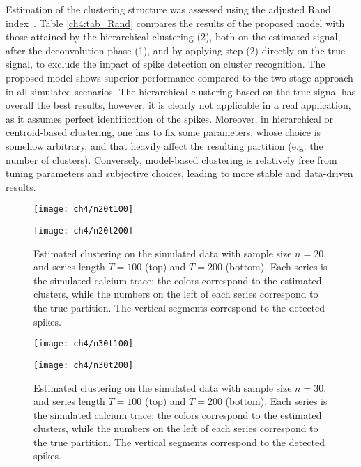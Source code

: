 Estimation of the clustering structure was assessed using the adjusted Rand index~\parencite{rand1971,hubert1985}. Table \ref{ch4:tab_Rand} compares the results of the proposed model with those attained by the hierarchical clustering (2), both on the estimated signal, after the deconvolution phase (1), and by applying step (2) directly on the true signal, to exclude the impact of spike detection on cluster recognition. The proposed model shows superior performance compared to the two-stage approach in all simulated scenarios. The hierarchical clustering based on the true signal has overall the best results, however, it is clearly not applicable in a real application, as it assumes perfect identification of the spikes.
Moreover, in hierarchical or centroid-based clustering, one has to fix some parameters, whose choice is somehow arbitrary, and that heavily affect the resulting partition (e.g. the number of clusters). Conversely, model-based clustering is relatively free from tuning parameters and subjective choices, leading to more stable and data-driven results.

\begin{figure}[b]
	\centering
	\texttt{[image: ch4/n20t100]}\\
	\centerline{
		\texttt{[image: ch4/n20t200]}
	}
	\label{ch4:fig_n20}
	\caption[Estimated clustering on the simulated data with sample size $n=20$.]{Estimated clustering on the simulated data with sample size $n=20$, and series length $T=100$ (top) and $T=200$ (bottom). Each series is the simulated calcium trace; the colors correspond to the estimated clusters, while the numbers on the left of each series correspond to the true partition. The vertical segments correspond to the detected spikes.}
\end{figure}

\begin{figure}
	\centering
	\texttt{[image: ch4/n30t100]}\\
	\centerline{
		\texttt{[image: ch4/n30t200]}
	}
	\label{ch4:fig_n30}
	\caption[Estimated clustering on the simulated data with sample size $n=30$.]{Estimated clustering on the simulated data with sample size $n=30$, and series length $T=100$ (top) and $T=200$ (bottom). Each series is the simulated calcium trace; the colors correspond to the estimated clusters, while the numbers on the left of each series correspond to the true partition. The vertical segments correspond to the detected spikes.}
\end{figure}

